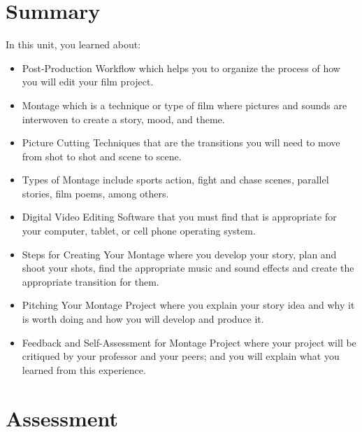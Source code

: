 \documentclass[
]{book}
\providecommand{\tightlist}{%
  \setlength{\itemsep}{0pt}\setlength{\parskip}{0pt}}
\begin{document}
\hypertarget{summary-6}{%
\section*{Summary}\label{summary-6}}

In this unit, you learned about:

\begin{itemize}
\tightlist
\item
  Post-Production Workflow which helps you to organize the process of how you will edit your film project.
\item
  Montage which is a technique or type of film where pictures and sounds are interwoven to create a story, mood, and theme.
\item
  Picture Cutting Techniques that are the transitions you will need to move from shot to shot and scene to scene.
\item
  Types of Montage include sports action, fight and chase scenes, parallel stories, film poems, among others.
\item
  Digital Video Editing Software that you must find that is appropriate for your computer, tablet, or cell phone operating system.
\item
  Steps for Creating Your Montage where you develop your story, plan and shoot your shots, find the appropriate music and sound effects and create the appropriate transition for them.
\item
  Pitching Your Montage Project where you explain your story idea and why it is worth doing and how you will develop and produce it.
\item
  Feedback and Self-Assessment for Montage Project where your project will be critiqued by your professor and your peers; and you will explain what you learned from this experience.
\end{itemize}

\hypertarget{assessment-13}{%
\section*{Assessment}\label{assessment-13}}
\end{document}
